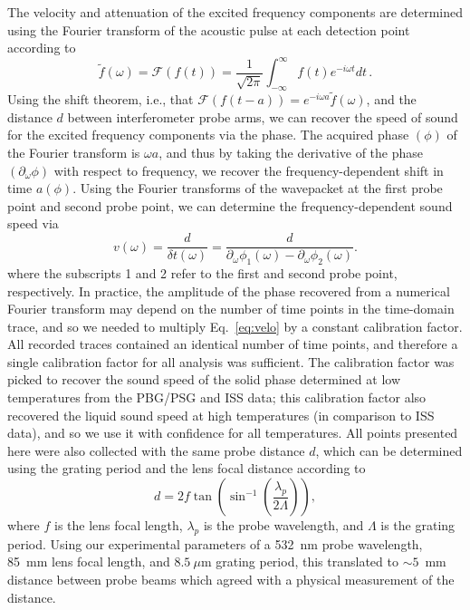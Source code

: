\documentclass[reprint,showpacs,amsmath,amssymb,aip,jcp]{revtex4-1}
\begin{document}
The velocity and attenuation of the excited frequency components are
determined using the Fourier transform of the acoustic pulse at each
detection point according to
\begin{equation}
  \tilde{f}(\omega) = \mathcal{F}(f(t)) = \frac{1}{\sqrt{2\pi}}
  \int_{-\infty}^{\infty}f(t)e^{-i\omega t}dt\,.
\end{equation}
Using the shift theorem, i.e., that $\mathcal{F}(f(t-a))=e^{-i\omega
  a}\tilde{f}(\omega)$, and the distance $d$ between interferometer
probe arms, we can recover the speed of sound for the excited
frequency components via the phase. The acquired phase $(\phi)$ of the
Fourier transform is $\omega a$, and thus by taking the derivative of
the phase $(\partial_\omega\phi)$ with respect to frequency, we
recover the frequency-dependent shift in time $a(\phi)$. Using the
Fourier transforms of the wavepacket at the first probe point and
second probe point, we can determine the frequency-dependent sound
speed via
\begin{equation}\label{eq:velo}
  v(\omega)=\frac{d}{\delta t(\omega)}=\frac{d}{\partial_\omega
    \phi_1 (\omega)-\partial_\omega \phi_2 (\omega)}.
\end{equation}
where the subscripts 1 and 2 refer to the first and second probe point,
respectively. In practice, the amplitude of the phase recovered from a
numerical Fourier transform may depend on the number of time points in
the time-domain trace, and so we needed to multiply Eq.\ \ref{eq:velo}
by a constant calibration factor.  All recorded traces contained an
identical number of time points, and therefore a single calibration
factor for all analysis was sufficient.  The calibration factor was
picked to recover the sound speed of the solid phase determined at low
temperatures from the PBG/PSG and ISS data; this calibration factor
also recovered the liquid sound speed at high temperatures (in
comparison to ISS data), and so we use it with confidence for all
temperatures.  All points presented here were also collected with the
same probe distance $d$, which can be determined using the grating
period and the lens focal distance according to
\begin{equation}
  d=2f\tan\left(\sin^{-1}\left(\frac{\lambda_p}{2\Lambda}\right)\right),
\end{equation}
where $f$ is the lens focal length, $\lambda_p$ is the probe
wavelength, and $\Lambda$ is the grating period. Using our
experimental parameters of a 532~nm probe wavelength, 85~mm lens focal
length, and $8.5~\mu$m grating period, this translated to $\sim 5$~mm
distance between probe beams which agreed with a physical measurement
of the distance.
\end{document}
